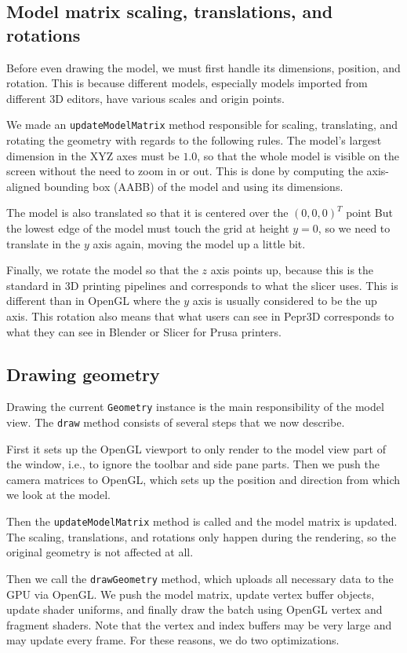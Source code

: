\subsection{Model matrix scaling, translations, and rotations}
Before even drawing the model, we must first handle its dimensions, position, and rotation.
This is because different models, especially models imported from different 3D editors, have various scales and origin points.

We made an \texttt{updateModelMatrix} method responsible for scaling, translating, and rotating the geometry with regards to the following rules.
The model's largest dimension in the XYZ axes must be $1.0$, so that the whole model is visible on the screen without the need to zoom in or out.
This is done by computing the axis-aligned bounding box (AABB) of the model and using its dimensions.

The model is also translated so that it is centered over the $(0,0,0)^T$ point
But the lowest edge of the model must touch the grid at height $y=0$, so we need to translate in the $y$ axis again, moving the model up a little bit.

Finally, we rotate the model so that the $z$ axis points up, because this is the standard in 3D printing pipelines and corresponds to what the slicer uses.
This is different than in OpenGL where the $y$ axis is usually considered to be the up axis.
This rotation also means that what users can see in Pepr3D corresponds to what they can see in Blender or Slicer for Prusa printers.

\subsection{Drawing geometry}

Drawing the current \texttt{Geometry} instance is the main responsibility of the model view.
The \texttt{draw} method consists of several steps that we now describe.

First it sets up the OpenGL viewport to only render to the model view part of the window, i.e., to ignore the toolbar and side pane parts.
Then we push the camera matrices to OpenGL, which sets up the position and direction from which we look at the model.

Then the \texttt{updateModelMatrix} method is called and the model matrix is updated.
The scaling, translations, and rotations only happen during the rendering, so the original geometry is not affected at all.

Then we call the \texttt{drawGeometry} method, which uploads all necessary data to the GPU via OpenGL.
We push the model matrix, update vertex buffer objects, update shader uniforms, and finally draw the batch using OpenGL vertex and fragment shaders.
Note that the vertex and index buffers may be very large and may update every frame.
For these reasons, we do two optimizations.

